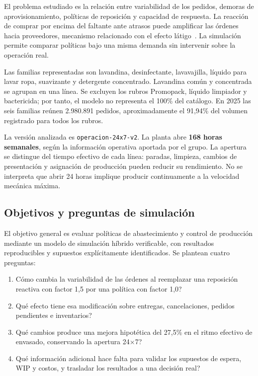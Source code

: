 \documentclass[11pt, a4paper]{article}
\begin{document}
El problema estudiado es la relación entre variabilidad de los pedidos, demoras de aprovisionamiento, políticas de reposición y capacidad de respuesta. La reacción de comprar por encima del faltante ante atrasos puede amplificar las órdenes hacia proveedores, mecanismo relacionado con el efecto látigo~\cite{lee,sterman}. La simulación permite comparar políticas bajo una misma demanda sin intervenir sobre la operación real.

Las familias representadas son lavandina, desinfectante, lavavajilla, líquido para lavar ropa, suavizante y detergente concentrado. Lavandina común y concentrada se agrupan en una línea. Se excluyen los rubros Promopack, líquido limpiador y bactericida; por tanto, el modelo no representa el 100\% del catálogo. En 2025 las seis familias reúnen 2.980.891 pedidos, aproximadamente el 91,94\% del volumen registrado para todos los rubros.

La versión analizada es \texttt{operacion-24x7-v2}. La planta abre \textbf{168 horas semanales}, según la información operativa aportada por el grupo. La apertura se distingue del tiempo efectivo de cada línea: paradas, limpieza, cambios de presentación y asignación de producción pueden reducir su rendimiento. No se interpreta que abrir 24 horas implique producir continuamente a la velocidad mecánica máxima.

\subsection{Objetivos y preguntas de simulación}
El objetivo general es evaluar políticas de abastecimiento y control de producción mediante un modelo de simulación híbrido verificable, con resultados reproducibles y supuestos explícitamente identificados. Se plantean cuatro preguntas:
\begin{enumerate}[leftmargin=0.6cm]
    \item \textquestiondown{}Cómo cambia la variabilidad de las órdenes al reemplazar una reposición reactiva con factor 1,5 por una política con factor 1,0?
    \item \textquestiondown{}Qué efecto tiene esa modificación sobre entregas, cancelaciones, pedidos pendientes e inventarios?
    \item \textquestiondown{}Qué cambios produce una mejora hipotética del 27,5\% en el ritmo efectivo de envasado, conservando la apertura 24$\times$7?
    \item \textquestiondown{}Qué información adicional hace falta para validar los supuestos de espera, WIP y costos, y trasladar los resultados a una decisión real?
\end{enumerate}
\end{document}

